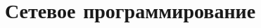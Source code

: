 \documentclass{beamer}
\title{Сетевое программирование}
\begin{document}
  \frame{\titlepage}
\end{document}

